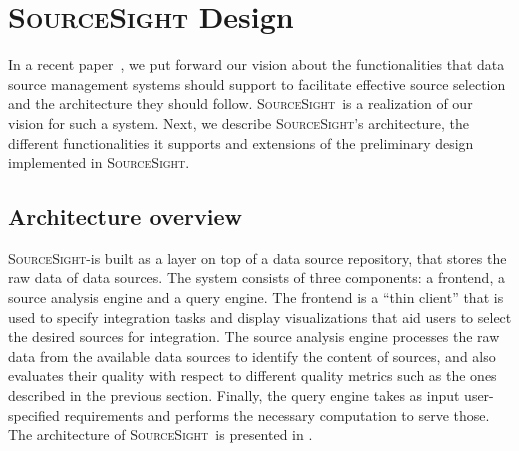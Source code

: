 \documentclass{vldb}
\newcommand\system{\textsc{SourceSight}}
\begin{document}
%
%
%
%
%
%
%
%
%
%

\section{{\Large \system} Design}
\label{sec:design}
In a recent paper~\cite{rekatsinas:2015}, we put forward our vision about the functionalities that data source management systems should support to facilitate effective source selection and the architecture they should follow. 
\system~is a realization of our vision for such a system. Next, we describe \system's architecture, the different functionalities it supports and extensions of the preliminary design implemented in \system.%

\subsection{Architecture overview}
\system-is built as a layer on top of a data source repository, that stores the raw data of data sources. The system consists of three components: a frontend, a source analysis engine and a query engine. The frontend is a ``thin client'' that is used to specify integration tasks and display visualizations that aid users to select the desired sources for integration. The source analysis engine processes the raw data from the available data sources to identify the content of sources, and also evaluates their quality with respect to different quality metrics such as the ones described in the previous section. Finally, the query engine takes as input user-specified requirements and performs the necessary computation to serve those. The architecture of \system~is presented in . 
\end{document}
